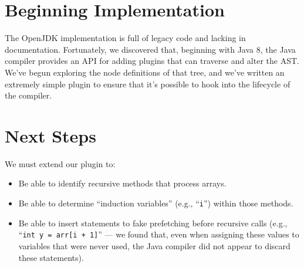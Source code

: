 \documentclass[journal,onecolumn]{IEEEtran}
\begin{document}
\section{Beginning Implementation}

The OpenJDK implementation is full of legacy code and lacking in documentation. Fortunately, we discovered that, beginning with Java 8, the Java compiler provides an API for adding plugins that can traverse and alter the AST. We've begun exploring the node definitions of that tree, and we've written an extremely simple plugin to ensure that it's possible to hook into the lifecycle of the compiler.


\section{Next Steps}

We must extend our plugin to:
\begin{itemize}[topsep=0em]
    \item Be able to identify recursive methods that process arrays.
    \item Be able to determine ``induction variables'' (e.g., ``\texttt{i}'') within those methods.
    \item Be able to insert statements to fake prefetching before recursive calls (e.g., ``\texttt{int y = arr[i + 1]}'' --- we found that, even when assigning these values to variables that were never used, the Java compiler did not appear to discard these statements).
\end{itemize}
\end{document}
